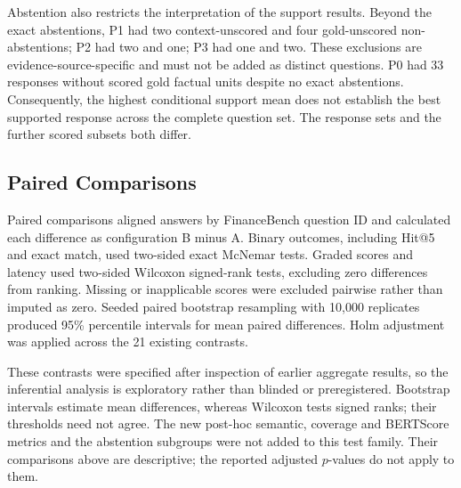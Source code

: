 Abstention also restricts the interpretation of the support results. Beyond
the exact abstentions, P1 had two context-unscored and four gold-unscored
non-abstentions; P2 had two and one; P3 had one and two. These exclusions are
evidence-source-specific and must not be added as distinct questions. P0 had
33 responses without scored gold factual units despite no exact abstentions.
Consequently, the highest conditional support mean does not establish the
best supported response across the complete question set. The response sets
and the further scored subsets both differ.

\subsection{Paired Comparisons}
Paired comparisons aligned answers by FinanceBench question ID and calculated
each difference as configuration B minus A. Binary outcomes, including Hit@5
and exact match, used two-sided exact McNemar tests. Graded scores and latency
used two-sided Wilcoxon signed-rank tests, excluding zero differences from
ranking. Missing or inapplicable scores were excluded pairwise rather than
imputed as zero. Seeded paired bootstrap resampling with 10,000 replicates
produced 95\% percentile intervals for mean paired differences. Holm
adjustment was applied across the 21 existing contrasts.

These contrasts were specified after inspection of earlier aggregate results,
so the inferential analysis is exploratory rather than blinded or
preregistered. Bootstrap intervals estimate mean differences, whereas
Wilcoxon tests signed ranks; their thresholds need not agree. The new
post-hoc semantic, coverage and BERTScore metrics and the abstention subgroups
were not added to this test family. Their comparisons above are descriptive;
the reported adjusted $p$-values do not apply to them.

